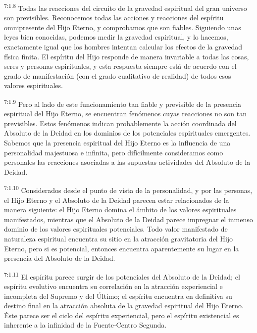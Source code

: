 \par
\textsuperscript{7:1.8} Todas las reacciones del circuito de la gravedad espiritual del gran universo son previsibles. Reconocemos todas las acciones y reacciones del espíritu omnipresente del Hijo Eterno, y comprobamos que son fiables. Siguiendo unas leyes bien conocidas, podemos medir la gravedad espiritual, y lo hacemos, exactamente igual que los hombres intentan calcular los efectos de la gravedad física finita. El espíritu del Hijo responde de manera invariable a todas las cosas, seres y personas espirituales, y esta respuesta siempre está de acuerdo con el grado de manifestación (con el grado cualitativo de realidad) de todos esos valores espirituales.

\par
\textsuperscript{7:1.9} Pero al lado de este funcionamiento tan fiable y previsible de la presencia espiritual del Hijo Eterno, se encuentran fenómenos cuyas reacciones no son tan previsibles. Estos fenómenos indican probablemente la acción coordinada del Absoluto de la Deidad en los dominios de los potenciales espirituales emergentes. Sabemos que la presencia espiritual del Hijo Eterno es la influencia de una personalidad majestuosa e infinita, pero difícilmente consideramos como personales las reacciones asociadas a las supuestas actividades del Absoluto de la Deidad.

\par
\textsuperscript{7:1.10} Considerados desde el punto de vista de la personalidad, y por las personas, el Hijo Eterno y el Absoluto de la Deidad parecen estar relacionados de la manera siguiente: el Hijo Eterno domina el ámbito de los valores espirituales manifestados, mientras que el Absoluto de la Deidad parece impregnar el inmenso dominio de los valores espirituales potenciales. Todo valor manifestado de naturaleza espiritual encuentra su sitio en la atracción gravitatoria del Hijo Eterno, pero si es potencial, entonces encuentra aparentemente su lugar en la presencia del Absoluto de la Deidad.

\par
\textsuperscript{7:1.11} El espíritu parece surgir de los potenciales del Absoluto de la Deidad; el espíritu evolutivo encuentra su correlación en la atracción experiencial e incompleta del Supremo y del Último; el espíritu encuentra en definitiva su destino final en la atracción absoluta de la gravedad espiritual del Hijo Eterno. Éste parece ser el ciclo del espíritu experiencial, pero el espíritu existencial es inherente a la infinidad de la Fuente-Centro Segunda.

